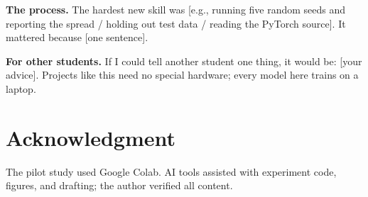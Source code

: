 \documentclass[conference]{IEEEtran}
\begin{document}
\textbf{The process.} The hardest new skill was [e.g., running five random seeds and reporting the
spread / holding out test data / reading the PyTorch source]. It mattered because [one sentence].

\textbf{For other students.} If I could tell another student one thing, it would be: [your advice].
Projects like this need no special hardware; every model here trains on a laptop.

\section*{Acknowledgment}
The pilot study used Google Colab. AI tools assisted with experiment code, figures, and drafting; the author
verified all content.
\end{document}

